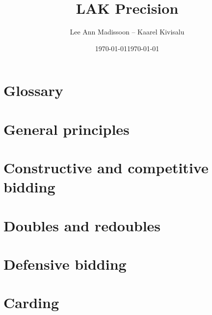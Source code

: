 \documentclass[11pt]{report}
\title{LAK Precision}
\author{Lee Ann Madissoon -- Kaarel Kivisalu}
\date{\today}
\date{\today\\\lakversion}
\begin{document}
\maketitle
\tableofcontents

\chapter*{Glossary}


\chapter{General principles}


\chapter{Constructive and competitive bidding}















% 

\chapter{Doubles and redoubles}


\chapter{Defensive bidding}


\chapter{Carding}

\end{document}
